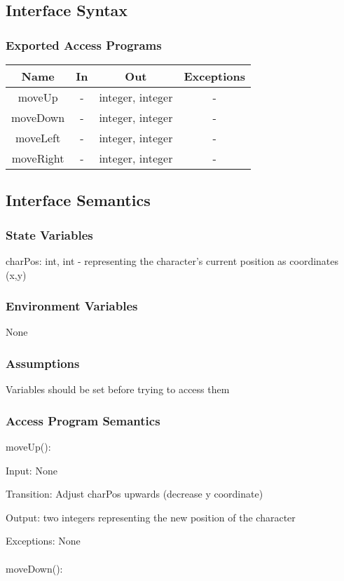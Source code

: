 \documentclass[12pt, titlepage]{article}
\begin{document}
		\subsection{Interface Syntax}
		\subsubsection{Exported Access Programs}
		\begin{tabular}[pos]{|c|c|c|c|}
			\hline
			\textbf{Name}& \textbf{In} & \textbf{Out} & \textbf{Exceptions} \\ \hline
			moveUp & - & integer, integer & - \\ \hline
			moveDown & - & integer, integer & - \\ \hline
			moveLeft & - & integer, integer & - \\ \hline
			moveRight & - & integer, integer & - \\ \hline
		\end{tabular}
		
		\subsection{Interface Semantics}
		\subsubsection{State Variables}
		charPos: int, int - representing the character's current position as coordinates (x,y)
		\subsubsection{Environment Variables}
		None
		\subsubsection{Assumptions}
		Variables should be set before trying to access them
		
		\subsubsection{Access Program Semantics}
		moveUp():
		
		Input: None
		
		Transition: Adjust charPos upwards (decrease y coordinate) 
		
		Output: two integers representing the new position of the character
		
		Exceptions: None\\
		\\
		moveDown():
		
\end{document}
